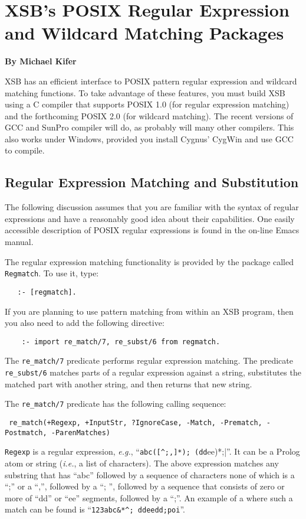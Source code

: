 \chapter{XSB's POSIX Regular Expression and Wildcard Matching Packages}

\begin{center}
{\Large {\bf By Michael Kifer}}
\end{center}

XSB has an efficient interface to POSIX pattern regular expression and
wildcard matching functions.  To take advantage of these features, you must
build XSB using a C compiler that supports POSIX 1.0 (for regular
expression matching) and the forthcoming POSIX 2.0 (for wildcard matching).
The recent versions of GCC and SunPro compiler will do, as probably will
many other compilers. This also works under Windows, provided you install
Cygnus' CygWin and use GCC to compile.

\section{Regular Expression Matching and Substitution}

The following discussion assumes that you are familiar with the syntax of
regular expressions and have a reasonably good idea about their
capabilities. One easily accessible description of POSIX regular
expressions is found in the on-line Emacs manual.

The regular expression matching functionality is provided by the package
called {\tt Regmatch}. To use it, type:
\begin{verbatim}
   :- [regmatch].
\end{verbatim}

If you are planning to use pattern matching from within an XSB program,
then you also need to add the following directive:
\begin{verbatim}
    :- import re_match/7, re_subst/6 from regmatch.
\end{verbatim}

The \verb|re_match/7| predicate performs regular expression matching.
The predicate \verb|re_subst/6| matches parts of a regular expression
against a string, substitutes the matched part with another string, and
then returns that new string.

The \verb|re_match/7| predicate has the following calling sequence:
\begin{verbatim}
 re_match(+Regexp, +InputStr, ?IgnoreCase, -Match, -Prematch, -Postmatch, -ParenMatches)
\end{verbatim}
{\tt Regexp} is a regular expression, {\it e.g.},
``\verb|abc([^;,]*); (dd|ee)*;|''. It can be a Prolog atom or string ({\it i.e.}, a list of
characters). The above expression matches any substring that has ``abc''
followed by a sequence of characters none of which is a ``;'' or a ``,'',
followed by a ``; '', followed by a sequence that consists of zero or more
of ``dd'' or ``ee'' segments, followed by a ``;''. An example of a
where such a match can be found is ``\verb|123abc&*^; ddeedd;poi|''.

